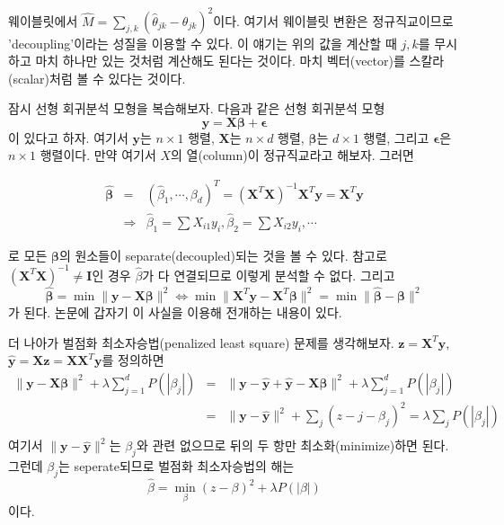 \documentclass[b5paper,]{scrbook}
\theoremstyle{plain}
\theoremstyle{definition}
\numberwithin{equation}{section}
\begin{document}
웨이블릿에서 \(\hat{M}=\sum_{j,k}(\hat{\theta}_{jk}-\theta_{jk})^{2}\)이다. 여기서 웨이블릿 변환은 정규직교이므로 'decoupling'이라는 성질을 이용할 수 있다. 이 얘기는 위의 값을 계산할 때 \(j,k\)를 무시하고 마치 하나만 있는 것처럼 계산해도 된다는 것이다. 마치 벡터(vector)를 스칼라(scalar)처럼 볼 수 있다는 것이다.

잠시 선형 회귀분석 모형을 복습해보자. 다음과 같은 선형 회귀분석 모형
\[\mathbf{y}=\mathbf{X}\boldsymbol{\beta}+\boldsymbol{\epsilon}\]
이 있다고 하자. 여기서 \(\mathbf{y}\)는 \(n \times 1\) 행렬, \(\mathbf{X}\)는 \(n \times d\) 행렬, \(\boldsymbol{\beta}\)는 \(d \times 1\) 행렬, 그리고 \(\boldsymbol{\epsilon}\)은 \(n \times 1\) 행렬이다. 만약 여기서 \(X\)의 열(column)이 정규직교라고 해보자. 그러면

\begin{eqnarray*}
\hat{\boldsymbol{\beta}}&=&(\hat{\beta}_{1},\cdots,\beta_{d})^{T}=(\mathbf{X}^{T}\mathbf{X})^{-1}\mathbf{X}^{T}\mathbf{y}=\mathbf{X}^{T}\mathbf{y}\\
&\Longrightarrow& \hat{\beta}_{1}=\sum X_{i1}y_{i}, \hat{\beta}_{2}=\sum X_{i2}y_{i}, \cdots
\end{eqnarray*}

로 모든 \(\boldsymbol{\beta}\)의 원소들이 separate(decoupled)되는 것을 볼 수 있다. 참고로 \((\mathbf{X}^{T}\mathbf{X})^{-1}\neq \mathbf{I}\)인 경우 \(\hat{\beta}\)가 다 연결되므로 이렇게 분석할 수 없다. 그리고
\[\hat{\boldsymbol{\beta}}=\min \| \mathbf{y}-\mathbf{X}\boldsymbol{\beta} \|^{2} \Leftrightarrow \min \| \mathbf{X}^{T}\mathbf{y} - \mathbf{X}^{T}\boldsymbol{\beta} \|^{2}=\min \| \hat{\boldsymbol{\beta}}-\boldsymbol{\beta} \|^{2}\]
가 된다. \citep{Donoho1994} 논문에 갑자기 이 사실을 이용해 전개하는 내용이 있다.

더 나아가 벌점화 최소자승법(penalized least square) 문제를 생각해보자. \(\mathbf{z}=\mathbf{X}^{T}\mathbf{y}\), \(\hat{\mathbf{y}}=\mathbf{Xz}=\mathbf{XX}^{T}\mathbf{y}\)를 정의하면
\begin{eqnarray*}
\| \mathbf{y}-\mathbf{X}\boldsymbol{\beta}\|^{2}+\lambda \sum_{j=1}^{d}P(| \beta_{j} |) &=& \| \mathbf{y}-\hat{\mathbf{y}}+\hat{\mathbf{y}}-\mathbf{X}\boldsymbol{\beta}\|^{2}+\lambda \sum_{j=1}^{d}P(|\beta_{j}|)\\
&=&\| \mathbf{y} -\hat{\mathbf{y}} \|^{2} + \sum_{j}(z-{j}-\beta_{j})^{2}=\lambda\sum_{j}P(|\beta_{j}|)\\
\end{eqnarray*}
여기서 \(\| \mathbf{y} -\hat{\mathbf{y}} \|^{2}\)는 \(\beta_{j}\)와 관련 없으므로 뒤의 두 항만 최소화(minimize)하면 된다. 그런데 \(\beta_{j}\)는 seperate되므로 벌점화 최소자승법의 해는
\[\hat{\beta}=\min_{\beta}(z-\beta)^{2}+\lambda P(| \beta |)\]
이다.
\end{document}
